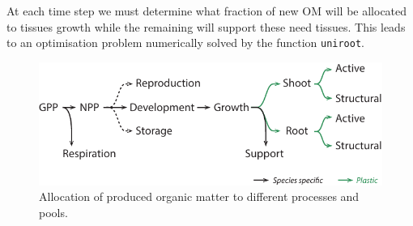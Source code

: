 \indent At each time step we must determine what fraction of new OM will be allocated to tissues growth while the remaining will support these need tissues. This leads to an optimisation problem numerically solved by the function \texttt{uniroot}.\\
\begin{figure}
\includegraphics{./Figures/allocation_path_t.pdf}
\caption{Allocation of produced organic matter to different processes and pools.}
\end{figure}


